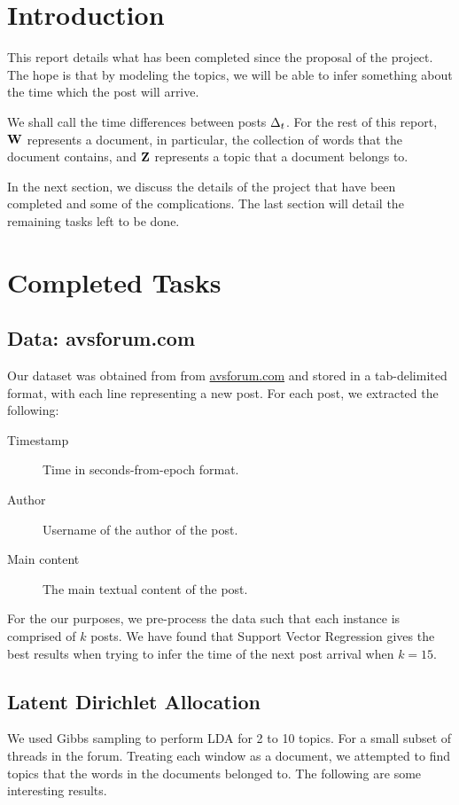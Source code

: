 \section{Introduction}
This report details what has been completed since the proposal of the project.
The hope is that by modeling the topics, we will be able to infer something 
about the time which the post will arrive.

We shall call the time differences between posts $\Delta_t$. For the rest of this 
report, $\mathbf{W}$ represents a document, in particular, the collection of words that 
the document contains, and $\mathbf{Z}$ represents a topic that a document belongs to.

In the next section, we discuss the details of the project that have been 
completed and some of the complications. The last section will detail the 
remaining tasks left to be done.
\section{Completed Tasks}
\subsection{Data: avsforum.com}
Our dataset was obtained from from \url{avsforum.com} and stored in a 
tab-delimited format, with each line representing a new post. For each post, we 
extracted the following:
\begin{description}
	\item[Timestamp] Time in seconds-from-epoch format.
	\item[Author] Username of the author of the post.
	\item[Main content] The main textual content of the post.
\end{description}
For the our purposes, we pre-process the data such that each instance is 
comprised of $k$ posts. We have found that Support Vector Regression gives the 
best results when trying to infer the time of the next post arrival when $k=15$.


\subsection{Latent Dirichlet Allocation}
We used Gibbs sampling to perform LDA for 2 to 10 topics. For a small subset of 
threads in the forum. Treating each window as a document, we attempted to find 
topics that the words in the documents belonged to. The following are some 
interesting results.

